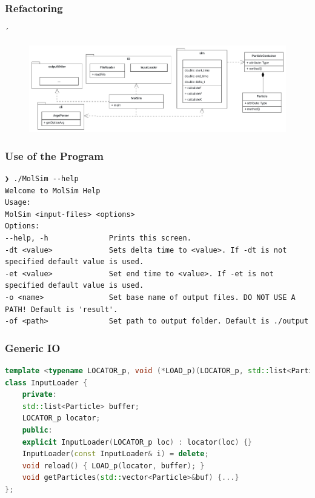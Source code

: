 
\begin{frame}
\frametitle{Refactoring}
\vspace{-0.5cm}
´\begin{figure}
	\centering
	\includegraphics[height=0.5\textheight]{UMLClassDiagram-1}
	\label{fig:umlclassdiagram-1}
\end{figure}
\end{frame}

\begin{frame}[fragile]
	\frametitle{Use of the Program}
	\vspace{0.7cm}
	\begin{Verbatim}
❯ ./MolSim --help
Welcome to MolSim Help
Usage:
MolSim <input-files> <options>
Options:
--help, -h              Prints this screen.
-dt <value>             Sets delta time to <value>. If -dt is not specified default value is used.
-et <value>             Set end time to <value>. If -et is not specified default value is used.
-o <name>               Set base name of output files. DO NOT USE A PATH! Default is 'result'.
-of <path>              Set path to output folder. Default is ./output
	\end{Verbatim}
\end{frame}

\begin{frame}[fragile]
\frametitle{Generic IO}
\vspace{0.7cm}
\begin{lstlisting}[language=C++]
template <typename LOCATOR_p, void (*LOAD_p)(LOCATOR_p, std::list<Particle>&)>
class InputLoader {
	private:
	std::list<Particle> buffer;
	LOCATOR_p locator;
	public:
	explicit InputLoader(LOCATOR_p loc) : locator(loc) {}
	InputLoader(const InputLoader& i) = delete;
	void reload() { LOAD_p(locator, buffer); }
	void getParticles(std::vector<Particle>&buf) {...}
};
\end{lstlisting}
\end{frame}

